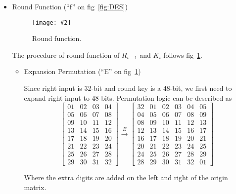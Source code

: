 \documentclass[11pt,a4paper]{article}
\newcommand{\image}[3]{
	\begin{figure}[!ht]
		\centering
	    \texttt{[image: \#2]}
		\caption{#3}
		\label{fig:#2}
	\end{figure}
}
\begin{document}
\begin{enumerate}
\begin{itemize}
		\item Round Function (``f'' on fig~\ref{fig:DES})
		\image{0.5}{RF}{Round function.}
		\par The procedure of round function of $R_{i-1}$ and $K_{i}$ follows fig~\ref{fig:RF}.
		\begin{itemize}
			\item Expansion Permutation (``E'' on fig~\ref{fig:RF})
			\par Since right input is 32-bit and round key is a 48-bit, we first need to expand right input to 48 bits. Permutation logic can be described as
			$$
				\begin{bmatrix}
					01 & 02 & 03 & 04 \\
					05 & 06 & 07 & 08 \\
					09 & 10 & 11 & 12 \\
					13 & 14 & 15 & 16 \\
					17 & 18 & 19 & 20 \\
					21 & 22 & 23 & 24 \\
					25 & 26 & 27 & 28 \\
					29 & 30 & 31 & 32
				\end{bmatrix}
				\xrightarrow{E}
				\left[
				\begin{array}{c|cccc|c}
					32 & 01 & 02 & 03 & 04 & 05 \\
					04 & 05 & 06 & 07 & 08 & 09 \\
					08 & 09 & 10 & 11 & 12 & 13 \\
					12 & 13 & 14 & 15 & 16 & 17 \\
					16 & 17 & 18 & 19 & 20 & 21 \\
					20 & 21 & 22 & 23 & 24 & 25 \\
					24 & 25 & 26 & 27 & 28 & 29 \\
					28 & 29 & 30 & 31 & 32 & 01
				\end{array}
				\right]
			$$
			\par Where the extra digits are added on the left and right of the origin matrix.
			

\end{itemize}
\end{itemize}
\end{enumerate}
\end{document}
